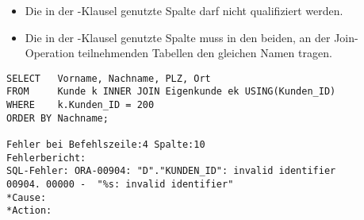         \begin{itemize}
          \item Die in der -Klausel genutzte Spalte darf nicht qualifiziert werden.
          \item Die in der -Klausel genutzte Spalte muss in den beiden, an der Join-Operation teilnehmenden Tabellen den gleichen Namen tragen.
        \end{itemize}
        \begin{lstlisting}[language=oracle_sql,caption={Fehlerhafte Nutzung der USING-Klausel in Oracle},label=sql04_07]
SELECT   Vorname, Nachname, PLZ, Ort
FROM     Kunde k INNER JOIN Eigenkunde ek USING(Kunden_ID)
WHERE    k.Kunden_ID = 200
ORDER BY Nachname;

Fehler bei Befehlszeile:4 Spalte:10
Fehlerbericht:
SQL-Fehler: ORA-00904: "D"."KUNDEN_ID": invalid identifier
00904. 00000 -  "%s: invalid identifier"
*Cause:
*Action:
        \end{lstlisting}
